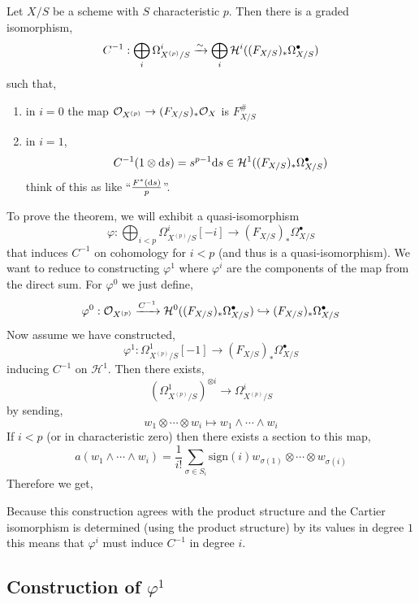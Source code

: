 \documentclass[12pt]{article}
\begin{document}
Let $X/S$ be a scheme with $S$ characteristic $p$. Then there is a graded isomorphism,
\[ C^{-1} : \bigoplus_{i} \Omega^i_{X^{(p)}/S} \xrightarrow{\sim} \bigoplus_i \mathcal{H}^i((F_{X/S})_* \Omega^\bullet_{X/S}) \]
such that,
\begin{enumerate}
\item in $i = 0$ the map $\mathcal{O}_{X^{(p)}} \to (F_{X/S})_* \mathcal{O}_{X}$ is $F_{X/S}^{\#}$
\item in $i = 1$,
\[ C^{-1}(1 \otimes \mathrm{d}{s}) = s^{p-1} \mathrm{d}{s} \in \mathcal{H}^1((F_{X/S})_* \Omega^\bullet_{X/S}) \]
think of this as like ``$\frac{F^*(\mathrm{d}{s})}{p}$''.  
\end{enumerate}
\noindent
To prove the theorem, we will exhibit a quasi-isomorphism
\[ \varphi : \bigoplus_{i < p} \Omega^i_{X^{(p)}/S}[-i] \to (F_{X/S})_* \Omega^\bullet_{X/S} \]
that induces $C^{-1}$ on cohomology for $i < p$ (and thus is a quasi-isomorphism). We want to reduce to constructing $\varphi^1$ where $\varphi^i$ are the components of the map from the direct sum. For $\varphi^0$ we just define,
\[ \varphi^0 : \mathcal{O}_{X^{(p)}} \xrightarrow{C^{-1}} \mathcal{H}^0((F_{X/S})_* \Omega^\bullet_{X/S}) \hookrightarrow (F_{X/S})_* \Omega^\bullet_{X/S} \]
Now assume we have constructed,
\[ \varphi^1 : \Omega^1_{X^{(p)}/S} [-1] \to (F_{X/S})_* \Omega^\bullet_{X/S} \]
inducing $C^{-1}$ on $\mathcal{H}^1$.
Then there exists,
\[ \left( \Omega^1_{X^{(p)}/S} \right)^{\otimes i} \to \Omega^i_{X^{(p)}/S} \]
by sending,
\[ w_1 \otimes \cdots \otimes w_i \mapsto w_1 \wedge \cdots \wedge w_i \]
If $i < p$ (or in characteristic zero) then there exists a section to this map,
\[ a(w_1 \wedge \cdots \wedge w_i)  = \frac{1}{i!} \sum_{\sigma \in S_i} \mathrm{sign}(i) w_{\sigma(1)} \otimes \cdots \otimes w_{\sigma(i)} \]
Therefore we get,
\begin{center}
\end{center}
Because this construction agrees with the product structure and the Cartier isomorphism is determined (using the product structure) by its values in degree $1$ this means that $\varphi^i$ must induce $C^{-1}$ in degree $i$.

\subsection{Construction of $\varphi^1$}
\end{document}
